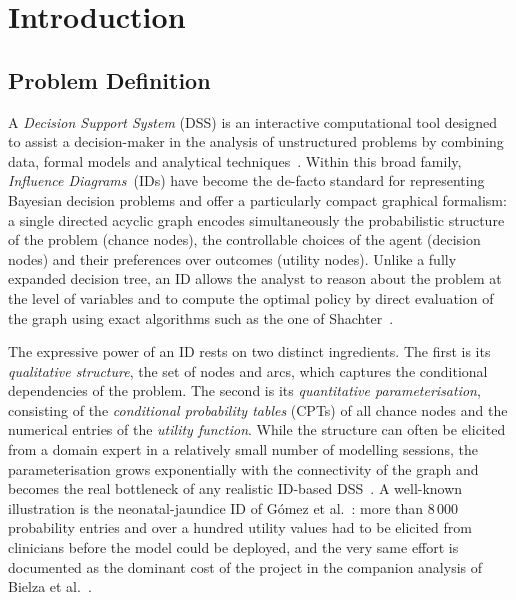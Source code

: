 
\chapter{Introduction}
\label{ch:introduction}

\section{Problem Definition}

A \emph{Decision Support System} (DSS) is an interactive
computational tool designed to assist a decision-maker in the analysis
of unstructured problems by combining data, formal models and
analytical techniques~\cite{insua2005}. Within
this broad family, \emph{Influence Diagrams}~(IDs)
\cite{howard2005influence,koller2009pgm,shenoy2009eolss} have become
the de-facto standard for representing Bayesian decision
problems and offer a particularly compact
graphical formalism:
a single directed acyclic graph encodes simultaneously the
probabilistic structure of the problem (chance nodes), the
controllable choices of the agent (decision nodes) and their
preferences over outcomes (utility nodes). Unlike a fully expanded
decision tree, an ID allows the analyst to reason about the problem
at the level of variables and to compute the optimal policy by direct
evaluation of the graph using exact algorithms such as the one of
Shachter~\cite{shachter1986evaluating}.

The expressive power of an ID rests on two distinct ingredients.
The first is its \emph{qualitative structure}, the set of nodes and
arcs, which captures the conditional dependencies of the problem.
The second is its \emph{quantitative parameterisation}, consisting of
the \emph{conditional probability tables} (CPTs) of all chance nodes and the
numerical entries of the \emph{utility function}. While the structure can
often be elicited from a domain expert in a relatively small number of
modelling sessions, the parameterisation grows exponentially with the
connectivity of the graph and becomes the real bottleneck of any
realistic ID-based DSS~\cite{bielza2010modeling}. A well-known
illustration is the neonatal-jaundice ID of G{\'o}mez et
al.~\cite{gomez2007jaundice}: more than 8\,000 probability entries
and over a hundred utility values had to be elicited from clinicians
before the model could be deployed, and the very same effort is
documented as the dominant cost of the project in the companion
analysis of Bielza et al.~\cite{bielza2000issues}.

